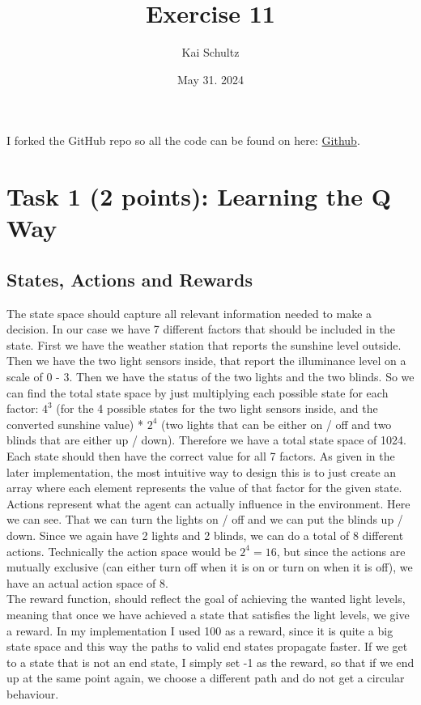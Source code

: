 \documentclass[11pt]{article}
\title{Exercise 11}
\author{Kai Schultz}
\date{May 31. 2024} %
\begin{document}
\maketitle
I forked the GitHub repo so all the code can be found on here: \href{https://github.com/KaiTries/exercise-11}{Github}.
\section*{Task 1 (2 points): Learning the Q Way}
\subsection*{States, Actions and Rewards}
The state space should capture all relevant information needed to make a decision. In our case we have 7 different factors that should be included in the state.
First we have the weather station that reports the sunshine level outside. Then we have the two light sensors inside, that report the illuminance level on a scale of 0 - 3.
Then we have the status of the two lights and the two blinds. 
So we can find the total state space by just multiplying each possible state for each factor: $4^3$ (for the 4 possible states for the two light sensors inside, and the converted sunshine value) * $2^4$ (two lights that can be either on / off and two blinds that are either up / down). Therefore we have a total state space of 1024. Each state should then have the correct value for all 7 factors. As given in the later implementation, the most intuitive way to design this is to just create an array where each element represents the value of that factor for the given state. \\
Actions represent what the agent can actually influence in the environment. Here we can see. That we can turn the lights on / off and we can put the blinds up / down. Since we again have 2 lights and 2 blinds, we can do a total of 8 different actions. Technically the action space would be $2^4 = 16$, but since the actions are mutually exclusive (can either turn off when it is on or turn on when it is off), we have an actual action space of 8.\\
The reward function, should reflect the goal of achieving the wanted light levels, meaning that once we have achieved a state that satisfies the light levels, we give a reward. In my implementation I used 100 as a reward, since it is quite a big state space and this way the paths to valid end states propagate faster. If we get to a state that is not an end state, I simply set -1 as the reward, so that if we end up at the same point again, we choose a different path and do not get  a circular behaviour. \\
\end{document}

